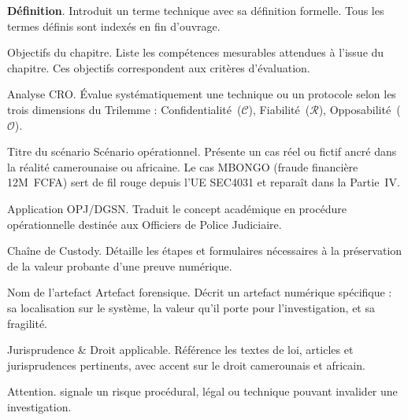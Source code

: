 \begin{boxdef}
\textbf{Définition}. Introduit un terme technique avec sa définition formelle.
Tous les termes définis sont indexés en fin d'ouvrage.
\end{boxdef}

\begin{boxobjectifs}
Objectifs du chapitre. Liste les compétences mesurables attendues à l'issue
du chapitre. Ces objectifs correspondent aux critères d'évaluation.
\end{boxobjectifs}

\begin{boxCRO}
Analyse CRO. Évalue systématiquement une technique ou un protocole selon
les trois dimensions du Trilemme : Confidentialité~($\mathcal{C}$),
Fiabilité~($\mathcal{R}$), Opposabilité~($\mathcal{O}$).
\end{boxCRO}

\begin{boxscenario}{Titre du scénario}
Scénario opérationnel. Présente un cas réel ou fictif ancré dans la réalité
camerounaise ou africaine. Le cas MBONGO (fraude financière 12M~FCFA) sert
de fil rouge depuis l'UE SEC4031 et reparaît dans la Partie~IV.
\end{boxscenario}

\begin{boxPNC}
Application OPJ/DGSN. Traduit le concept académique en procédure opérationnelle
destinée aux Officiers de Police Judiciaire.
\end{boxPNC}

\begin{boxcustody}
Chaîne de Custody. Détaille les étapes et formulaires nécessaires à la
préservation de la valeur probante d'une preuve numérique.
\end{boxcustody}

\begin{boxartefact}{Nom de l'artefact}
Artefact forensique. Décrit un artefact numérique spécifique : sa localisation
sur le système, la valeur qu'il porte pour l'investigation, et sa fragilité.
\end{boxartefact}

\begin{boxjuris}
Jurisprudence \& Droit applicable. Référence les textes de loi, articles et
jurisprudences pertinents, avec accent sur le droit camerounais et africain.
\end{boxjuris}

\begin{boxalert}
Attention. signale un risque procédural, légal ou technique pouvant
invalider une investigation.
\end{boxalert}

